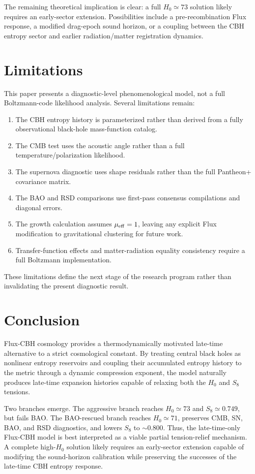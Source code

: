\documentclass[11pt,a4paper]{article}
\begin{document}
The remaining theoretical implication is clear: a full $H_0\simeq73$ solution likely requires an early-sector extension. Possibilities include a pre-recombination Flux response, a modified drag-epoch sound horizon, or a coupling between the CBH entropy sector and earlier radiation/matter registration dynamics.

\section{Limitations}

This paper presents a diagnostic-level phenomenological model, not a full Boltzmann-code likelihood analysis. Several limitations remain:
\begin{enumerate}
\item The CBH entropy history is parameterized rather than derived from a fully observational black-hole mass-function catalog.
\item The CMB test uses the acoustic angle rather than a full temperature/polarization likelihood.
\item The supernova diagnostic uses shape residuals rather than the full Pantheon+ covariance matrix.
\item The BAO and RSD comparisons use first-pass consensus compilations and diagonal errors.
\item The growth calculation assumes $\mu_{\rm eff}=1$, leaving any explicit Flux modification to gravitational clustering for future work.
\item Transfer-function effects and matter-radiation equality consistency require a full Boltzmann implementation.
\end{enumerate}
These limitations define the next stage of the research program rather than invalidating the present diagnostic result.

\section{Conclusion}

Flux-CBH cosmology provides a thermodynamically motivated late-time alternative to a strict cosmological constant. By treating central black holes as nonlinear entropy reservoirs and coupling their accumulated entropy history to the metric through a dynamic compression exponent, the model naturally produces late-time expansion histories capable of relaxing both the $H_0$ and $S_8$ tensions.

Two branches emerge. The aggressive branch reaches $H_0\simeq73$ and $S_8\simeq0.749$, but fails BAO. The BAO-rescued branch reaches $H_0\simeq71$, preserves CMB, SN, BAO, and RSD diagnostics, and lowers $S_8$ to $\sim0.800$. Thus, the late-time-only Flux-CBH model is best interpreted as a viable partial tension-relief mechanism. A complete high-$H_0$ solution likely requires an early-sector extension capable of modifying the sound-horizon calibration while preserving the successes of the late-time CBH entropy response.
\end{document}
